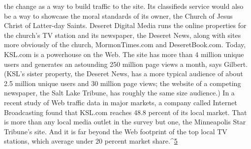 the change as a way to build traffic to the site. Its classifieds service would also be
a way to showcase the moral standards of its owner, the Church of Jesus Christ
of Latter-day Saints. Deseret Digital Media runs the online properties for the
church's TV station and its newspaper, the Deseret News, along with sites more
obviously of the church, MormonTimes.com and DeseretBook.com.
Today, KSL.com is a powerhouse on the Web. The site has more than 4 million
unique users and generates an astounding 250 million page views a month, says
Gilbert. (KSL's sister property, the Deseret News, has a more typical audience of
about 2.5 million unique users and 30 million page views; the website of a competing
newspaper, the Salt Lake Tribune, has roughly the same size audience.) In
a recent study of Web traffic data in major markets, a company called Internet
Broadcasting found that KSL.com reaches 48.8 percent of its local market. That
is more than any local media outlet in the survey but one, the Minneapolis Star
Tribune's site. And it is far beyond the Web footprint of the top local TV stations,
which average under 20 percent market share.^{\href{#endnotes-chapter-8}{5}}

